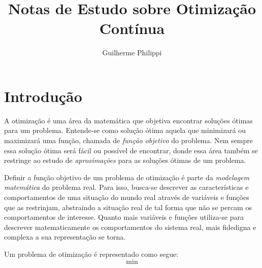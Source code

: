 \documentclass[a4paper,12pt]{article}
\title{Notas de Estudo sobre Otimização Contínua}
\author{Guilherme Philippi}
\begin{document}
\maketitle
\tableofcontents



\section{Introdução}

A otimização é uma área da matemática que objetiva encontrar soluções ótimas para um problema. Entende-se como solução ótima aquela que minimizará ou maximizará uma função, chamada de \textit{função objetivo} do problema. Nem sempre essa solução ótima será fácil ou possível de encontrar, donde essa área também se restringe ao estudo de \textit{aproximações} para as soluções ótimas de um problema.

Definir a função objetivo de um problema de otimização é parte da \textit{modelagem matemática} do problema real. Para isso, busca-se descrever as características e comportamentos de uma situação do mundo real através de variáveis e funções que as restrinjam, abstraindo a situação real de tal forma que não se percam os comportamentos de interesse. Quanto mais variáveis e funções utiliza-se para descrever matematicamente os comportamentos do sistema real, mais fidedigna e complexa a sua representação se torna.

Um problema de otimização é representado como segue: 
$$\min_{}$$



{}



\end{document}
